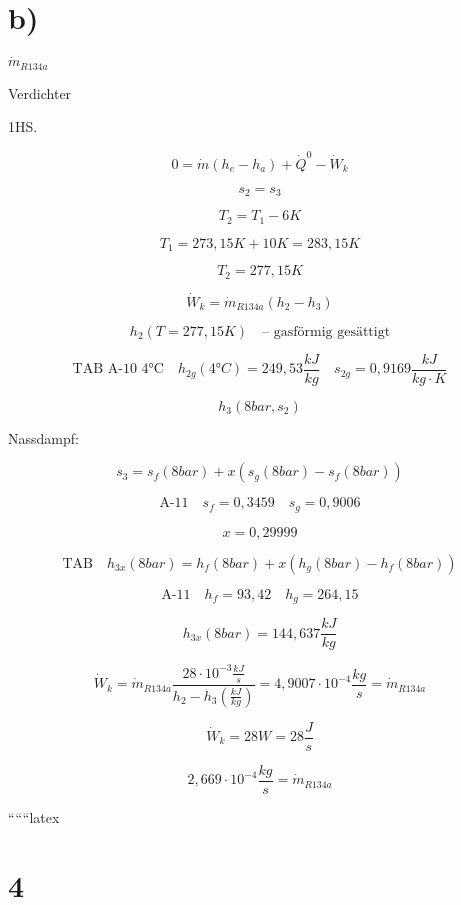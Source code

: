 

\section*{b)}

\(\dot{m}_{R134a}\)

Verdichter

1HS.

\[
0 = \dot{m}(h_e - h_a) + \dot{Q}^0 - \dot{W}_k
\]

\[
s_2 = s_3
\]

\[
T_2 = T_1 - 6K
\]

\[
T_1 = 273{,}15K + 10K = 283{,}15K
\]

\[
T_2 = 277{,}15K
\]

\[
\dot{W}_k = \dot{m}_{R134a} (h_2 - h_3)
\]

\[
h_2 (T = 277{,}15K) \quad \text{-- gasförmig gesättigt}
\]

\[
\text{TAB A-10 4°C} \quad h_{2g} (4°C) = 249{,}53 \frac{kJ}{kg} \quad s_{2g} = 0{,}9169 \frac{kJ}{kg \cdot K}
\]

\[
h_3 (8 bar, s_2)
\]

Nassdampf:

\[
s_3 = s_f (8 bar) + x (s_g (8 bar) - s_f (8 bar))
\]

\[
\text{A-11} \quad s_f = 0{,}3459 \quad s_g = 0{,}9006
\]

\[
x = 0{,}29999
\]

\[
\text{TAB} \quad h_{3x} (8 bar) = h_f (8 bar) + x (h_g (8 bar) - h_f (8 bar))
\]

\[
\text{A-11} \quad h_f = 93{,}42 \quad h_g = 264{,}15
\]

\[
h_{3x} (8 bar) = 144{,}637 \frac{kJ}{kg}
\]

\[
\dot{W}_k = \dot{m}_{R134a} \frac{28 \cdot 10^{-3} \frac{kJ}{s}}{h_2 - h_3 \left( \frac{kJ}{kg} \right)} = 4{,}9007 \cdot 10^{-4} \frac{kg}{s} = \dot{m}_{R134a}
\]

\[
\dot{W}_k = 28W = 28 \frac{J}{s}
\]

\[
2{,}669 \cdot 10^{-4} \frac{kg}{s} = \dot{m}_{R134a}
\]

``````latex

\section*{4}